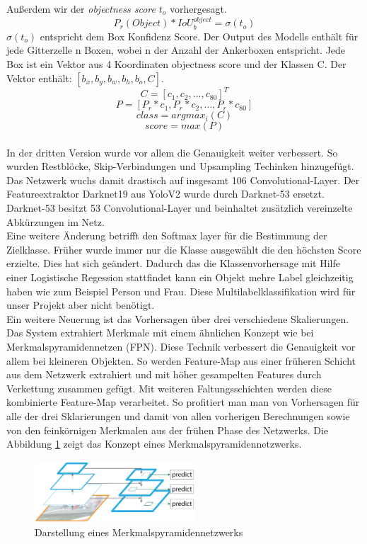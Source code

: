 \documentclass[conference]{IEEEtran}
\begin{document}
	Außerdem wir der \textit{objectness score} $t_o$ vorhergesagt.
	\[ P_r(Object)*IoU_{b}^{object} = \sigma(t_o) \]
	$\sigma(t_o)$ entspricht dem Box Konfidenz Score.
	Der Output des Modells enthält für jede Gitterzelle n Boxen, wobei n der Anzahl der Ankerboxen entspricht. Jede Box ist ein Vektor aus 4 Koordinaten objectness score und der Klassen C. Der Vektor enthält: $[b_x,b_y,b_w,b_h, b_o, C]$\cite{b3}.
	\[ C = [c_1, c_2,..., c_{80}]^T\]
	\[ P = [P_r * c_1, P_r * c_2, ..., P_r * c_{80}] \]
	\[ class = argmax_i(C)\]
	\[ score = max(P)\]\\
	In der dritten Version wurde vor allem die Genauigkeit weiter verbessert. So wurden Restblöcke, Skip-Verbindungen und Upsampling Techinken hinzugefügt. Das Netzwerk wuchs damit drastisch auf insgesamt 106 Convolutional-Layer.
	Der Featureextraktor Darknet19 aus YoloV2 wurde durch Darknet-53 ersetzt. Darknet-53 besitzt 53 Convolutional-Layer und beinhaltet zusätzlich vereinzelte Abkürzungen im Netz.\\
	Eine weitere Änderung betrifft den Softmax layer für die Bestimmung der Zielklasse. Früher wurde immer nur die Klasse ausgewählt die den höchsten Score erzielte. Dies hat sich geändert. Dadurch das die Klassenvorhersage mit Hilfe einer Logistische Regession stattfindet kann ein Objekt mehre Label gleichzeitig haben wie zum Beispiel Person und Frau. Diese Multilabelklassifikation wird für unser Projekt aber nicht benötigt.\\
	Ein weitere Neuerung ist das Vorhersagen über drei verschiedene Skalierungen. Das System extrahiert Merkmale mit einem ähnlichen Konzept wie bei Merkmalspyramidennetzen (FPN). Diese Technik verbessert die Genauigkeit vor allem bei kleineren Objekten. So werden Feature-Map aus einer früheren Schicht aus dem Netzwerk extrahiert und mit höher gesampelten Features durch Verkettung zusammen gefügt. Mit weiteren Faltungsschichten werden diese kombinierte Feature-Map verarbeitet. So profitiert man man von Vorhersagen für alle der drei Sklarierungen und damit von allen vorherigen Berechnungen sowie von den feinkörnigen Merkmalen aus der frühen Phase des Netzwerks. Die Abbildung \ref{FPN} zeigt das Konzept eines Merkmalspyramidennetzwerks.
	\begin{figure}[!h]
		\begin{center}
			\includegraphics[width=6cm]{Media/FPN.png}
			\caption{Darstellung eines Merkmalspyramidennetzwerks \cite{b6}}
			\label{FPN}
		\end{center}
	\end{figure}\\
\end{document}
